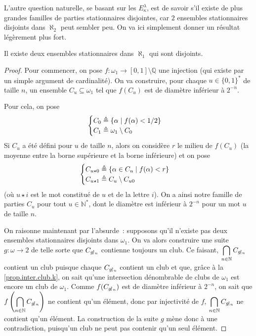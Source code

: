 L'autre question naturelle, se basant sur les $E_\kappa^\lambda$, est de savoir
s'il existe de plus grandes familles de parties stationnaires disjointes, car
$2$ ensembles stationnaires disjoints dans $\aleph_2$ peut sembler peu. On va
ici simplement donner un résultat légèrement plus fort.

\begin{proposition}\label{prop.al1.deuxdis}
  Il existe deux ensembles stationnaires dans $\aleph_1$ qui sont disjoints.
\end{proposition}

\begin{proof}
  Pour commencer, on pose $f : \omega_1 \to [0,1]\setminus \mathbb Q$ une
  injection (qui existe par un simple argument de cardinalité). On va
  construire, pour chaque $u \in \{0,1\}^*$ de taille $n$, un ensemble
  $C_u\subseteq \omega_1$ tel que $f(C_u)$ est de diamètre inférieur à
  $2^{-n}$.

  Pour cela, on pose
  \[\begin{cases}
  C_0 \triangleq \{\alpha \mid f(\alpha) < 1/2\}\\
  C_1 \triangleq \omega_1\setminus C_0
  \end{cases}\]
  Si $C_u$ a été défini pour $u$ de taille $n$, alors on considère $r$ le
  milieu de $f(C_u)$
  (la moyenne entre la borne supérieure et la borne inférieure) et on pose
  \[\begin{cases}
  C_{u\star 0} \triangleq \{\alpha \in C_u \mid f(\alpha) < r\}\\
  C_{u\star 1} \triangleq C_u \setminus C_{u0}
  \end{cases}\]
  (où $u\star i$ est le mot constitué de $u$ et de la lettre $i$).
  On a ainsi notre famille de parties $C_u$ pour tout $u \in \mathbb N^*$, dont
  le diamètre est inférieur à $2^{-n}$ pour un mot $u$ de taille $n$.

  On raisonne maintenant par l'absurde~: supposons qu'il n'existe pas deux
  ensembles stationnaires disjoints dans $\omega_1$. On va alors construire une
  suite $g : \omega \to 2$ de telle sorte que $C_{g\!\upharpoonright_{n}}$ contienne toujours
  un club. Ce faisant, $\displaystyle\bigcap_{n\in \mathbb N} C_{g\!\upharpoonright_{n}}$
  contient un club puisque chaque $C_{g\!\upharpoonright_{n}}$ contient un club et que,
  grâce à la \cref{prop.inter.club.k}, on sait qu'une intersection dénombrable
  de clubs de $\omega_1$ est encore un club de $\omega_1$. Comme
  $f(C_{g\!\upharpoonright_{n}})$ est de diamètre inférieur à $2^{-n}$, on sait que
  $\displaystyle f\left(\bigcap_{n \in \mathbb N} C_{g\!\upharpoonright_{n}}\right)$
  ne contient qu'un élément, donc par injectivité de $f$,
  $\displaystyle \bigcap_{n \in \mathbb N} C_{g\!\upharpoonright_{n}}$ ne contient qu'un élément.
  La construction de la suite $g$ mène donc à une contradiction, puisqu'un
  club ne peut pas contenir qu'un seul élément.


\end{proof}
